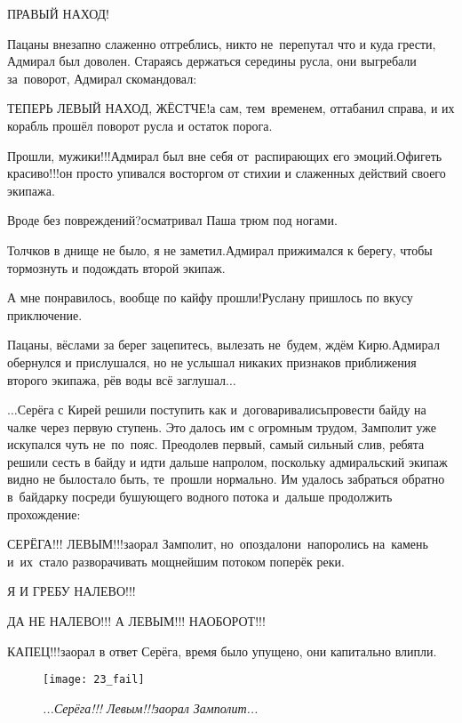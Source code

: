 \diagdash ПРАВЫЙ НАХОД!

Пацаны внезапно слаженно отгреблись, никто не~перепутал что и куда грести, Адмирал был доволен. Стараясь держаться середины русла, они выгребали за~поворот, Адмирал скомандовал:

\diagdash ТЕПЕРЬ ЛЕВЫЙ НАХОД, ЖЁСТЧЕ!\mdash а сам, тем~временем, оттабанил справа, и их корабль прошёл поворот русла и остаток порога.

\diagdash Прошли, мужики!!!\mdash Адмирал был вне себя от~распирающих его эмоций.\mdash Офигеть красиво!!!\mdash он просто упивался восторгом от стихии и слаженных действий своего экипажа.

\diagdash Вроде без повреждений?\mdash осматривал Паша трюм под ногами.

\diagdash Толчков в днище не было, я не заметил.\mdash Адмирал прижимался к берегу, чтобы тормознуть и подождать второй экипаж.

\diagdash А мне понравилось, вообще по кайфу прошли!\mdash Руслану пришлось по вкусу приключение.

\diagdash Пацаны, вёслами за берег зацепитесь, вылезать не~будем, ждём Кирю.\mdash Адмирал обернулся и прислушался, но не услышал никаких признаков приближения второго экипажа, рёв воды всё заглушал$\ldots$

\vspace{0.5cm}
$\ldots$Серёга с Кирей решили поступить как и~договаривались\mdash провести байду на чалке через первую ступень. Это далось им с огромным трудом, Замполит уже искупался чуть не~по~пояс. Преодолев первый, самый сильный слив, ребята решили сесть в байду и идти дальше напролом, поскольку адмиральский экипаж видно не было\mdash стало быть, те~прошли нормально. Им удалось забраться обратно в~байдарку посреди бушующего водного потока и~дальше продолжить прохождение:

\diagdash СЕРЁГА!!! ЛЕВЫМ!!!\mdash заорал Замполит, но~опоздал\mdash они~напоролись на~камень и~их~стало разворачивать мощнейшим потоком поперёк реки.

\diagdash Я И ГРЕБУ НАЛЕВО!!!

\diagdash ДА НЕ НАЛЕВО!!! А ЛЕВЫМ!!! НАОБОРОТ!!!

\diagdash КАПЕЦ!!!\mdash заорал в ответ Серёга, время было упущено, они капитально влипли.

\begin{figure}[h]
	\centering
	\texttt{[image: 23\_fail]}
	\caption{\small\textit{...Серёга!!! Левым!!!\mdash заорал Замполит...}}
\end{figure}

